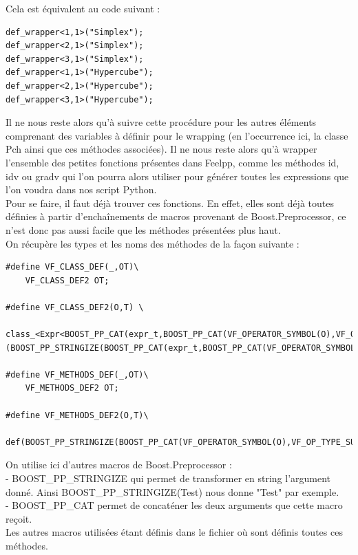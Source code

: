 \documentclass[french,12pt]{article}
\begin{document}
Cela est équivalent au code suivant :
\begin{lstlisting}
def_wrapper<1,1>("Simplex");
def_wrapper<2,1>("Simplex");
def_wrapper<3,1>("Simplex");
def_wrapper<1,1>("Hypercube");
def_wrapper<2,1>("Hypercube");
def_wrapper<3,1>("Hypercube");
\end{lstlisting}

Il ne nous reste alors qu'à suivre cette procédure pour les autres éléments comprenant des variables à définir pour le wrapping (en l'occurrence ici, la classe Pch ainsi que ces méthodes associées). Il ne nous reste alors qu'à wrapper l'ensemble des petites fonctions présentes dans Feelpp, comme les méthodes id, idv ou gradv qui l'on pourra alors utiliser pour générer toutes les expressions que l'on voudra dans nos script Python.\\

Pour se faire, il faut déjà trouver ces fonctions. En effet, elles sont déjà toutes définies à partir d’enchaînements de macros provenant de Boost.Preprocessor, ce n'est donc pas aussi facile que les méthodes présentées plus haut.\\
On récupère les types et les noms des méthodes de la façon suivante :
\begin{lstlisting}
#define VF_CLASS_DEF(_,OT)\
    VF_CLASS_DEF2 OT;

#define VF_CLASS_DEF2(O,T) \
     class_<Expr<BOOST_PP_CAT(expr_t,BOOST_PP_CAT(VF_OPERATOR_SYMBOL(O),VF_OP_TYPE_SUFFIX(T)))>>(BOOST_PP_STRINGIZE(BOOST_PP_CAT(expr_t,BOOST_PP_CAT(VF_OPERATOR_SYMBOL(O),VF_OP_TYPE_SUFFIX(T)))),no_init)

#define VF_METHODS_DEF(_,OT)\
    VF_METHODS_DEF2 OT;
    
#define VF_METHODS_DEF2(O,T)\
    def(BOOST_PP_STRINGIZE(BOOST_PP_CAT(VF_OPERATOR_SYMBOL(O),VF_OP_TYPE_SUFFIX(T))),Feel::vf::BOOST_PP_CAT(VF_OPERATOR_SYMBOL(O),VF_OP_TYPE_SUFFIX(T)))       
\end{lstlisting}

On utilise ici d'autres macros de Boost.Preprocessor :\\

- BOOST\_PP\_STRINGIZE qui permet de transformer en string l'argument donné. Ainsi BOOST\_PP\_STRINGIZE(Test) nous donne "Test" par exemple.\\

- BOOST\_PP\_CAT permet de concaténer les deux arguments que cette macro reçoit.\\

Les autres macros utilisées étant définis dans le fichier où sont définis toutes ces méthodes.
\end{document}

